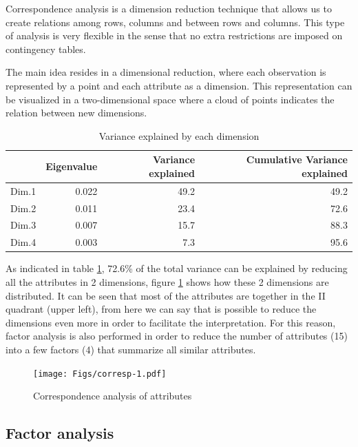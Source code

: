 \documentclass[
  12pt,
]{article}
\begin{document}
Correspondence analysis is a dimension reduction technique that allows us to create relations among rows, columns and between rows and columns. This type of analysis is very flexible in the sense that no extra restrictions are imposed on contingency tables.

The main idea resides in a dimensional reduction, where each observation is represented by a point and each attribute as a dimension. This representation can be visualized in a two-dimensional space where a cloud of points indicates the relation between new dimensions.

\begin{table}[H]

\caption{\label{tab:corrtb}Variance explained by each dimension}
\begin{tabular}[t]{l|r|r|r}
\hline
  & Eigenvalue & Variance explained & Cumulative 
Variance explained\\
\hline
Dim.1 & 0.022 & 49.2 & 49.2\\
\hline
Dim.2 & 0.011 & 23.4 & 72.6\\
\hline
Dim.3 & 0.007 & 15.7 & 88.3\\
\hline
Dim.4 & 0.003 & 7.3 & 95.6\\
\hline
\end{tabular}
\end{table}

As indicated in table \ref{tab:corrtb}, 72.6\% of the total variance can be explained by reducing all the attributes in 2 dimensions, figure \ref{fig:corresp} shows how these 2 dimensions are distributed. It can be seen that most of the attributes are together in the II quadrant (upper left), from here we can say that is possible to reduce the dimensions even more in order to facilitate the interpretation. For this reason, factor analysis is also performed in order to reduce the number of attributes (15) into a few factors (4) that summarize all similar attributes.

\begin{figure}
\centering
\texttt{[image: Figs/corresp-1.pdf]}
\caption{\label{fig:corresp}Correspondence analysis of attributes}
\end{figure}

\hypertarget{factor-analysis}{%
\subsection{Factor analysis}\label{factor-analysis}}
\end{document}
